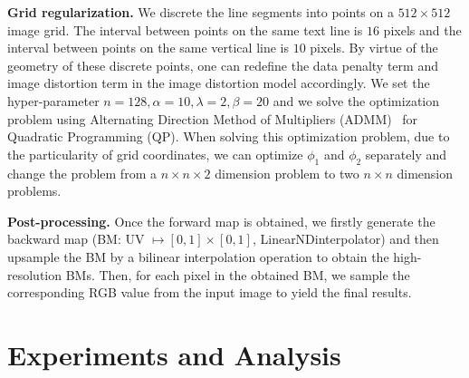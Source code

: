 \documentclass[10pt,twocolumn,letterpaper]{article}
\newcommand{\myparagraph}[1]{\vspace{1pt} \noindent \textbf{#1} }
\begin{document}
\myparagraph{Grid regularization.} We discrete the line segments into points on a $512 \times 512$ image grid. The interval between points on the same text line is $16$ pixels and the interval between points on the same vertical line is $10$ pixels. By virtue of the geometry of these discrete points, one can redefine the data penalty term and image distortion term in the image distortion model accordingly. We set the hyper-parameter $n =128, \alpha =10, \lambda = 2, \beta = 20$ and we solve the optimization problem using Alternating Direction Method of Multipliers (ADMM)~\cite{diamond2016cvxpy} for Quadratic Programming (QP). When solving this optimization problem, due to the particularity of grid coordinates, we can optimize $\phi_{1}$ and $\phi_{2}$ separately and change the problem from a $n\times n \times 2$ dimension problem to two $n \times n$ dimension problems.

\myparagraph{Post-processing.} Once the forward map is obtained, we firstly generate the backward map (BM: UV $\mapsto \left[ 0,1 \right] \times \left[ 0,1 \right]$, LinearNDinterpolator) and then upsample the BM by a bilinear interpolation operation to obtain the high-resolution BMs. Then, for each pixel in the obtained BM, we sample the corresponding RGB value from the input image to yield the final results.

\section{Experiments and Analysis}
\label{sec:exper}
\end{document}
